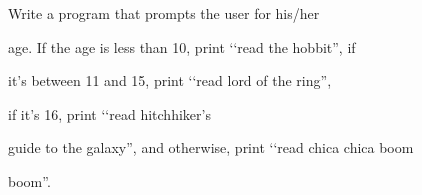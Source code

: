 Write a program that prompts the user for his/her

age. If the age is less than 10, print \lq\lq read the hobbit'', if

it's between 11 and 15, print \lq\lq read lord of the ring'',

if it's 16, print \lq\lq read hitchhiker's

guide to the galaxy'', and otherwise, print \lq\lq read chica chica boom

boom''.

